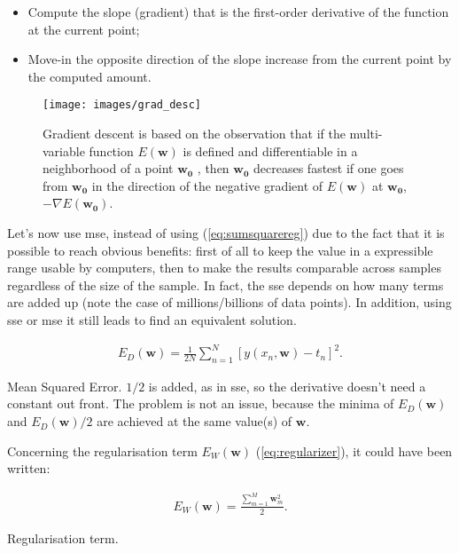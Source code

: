 \begin{itemize}
	\item Compute the slope (gradient) that is the first-order derivative of the function at the current point;
	\item Move-in the opposite direction of the slope increase from the current point by the computed amount.
\end{itemize}

\begin{figure}[H]
	\centering
	\texttt{[image: images/grad\_desc]}
	\caption[Gradient descent.]{Gradient descent is based on the observation that if the multi-variable function $E(\bm{w})$ is defined and differentiable in a neighborhood of a point $\bm{w_0}$ , then $\bm{w_0}$ decreases fastest if one goes from $\bm{w_0}$  in the direction of the negative gradient of $E(\bm{w})$ at $\bm{w_0}$, $-\nabla E(\bm{w_0})$.}
	\label{fig:grad_desc}
\end{figure}

\noindent Let's now use \gls{mse}, instead of using (\ref{eq:sumsquarereg}) due to the fact that it is possible to reach obvious benefits: first of all to keep the value in a expressible range usable by computers, then to make the results comparable across samples regardless of the size of the sample. In fact, the \gls{sse} depends on how many terms are added up (note the case of millions/billions of data points). In addition, using \gls{sse} or \gls{mse} it still leads to find an equivalent solution.

\begin{Equation}[H]
	\centering
	\begin{equation} \label{eq:mser}
		\begin{aligned}
			E_D(\bm{w}) = \frac{1}{2N} \sum_{n=1}^{N} [y(x_n,\bm{w})-t_n]^2 .
		\end{aligned}
	\end{equation}
	\caption[Mean Squared Error.]{Mean Squared Error. $1/2$ is added, as in \gls{sse}, so the derivative doesn't need a constant out front. The problem is not an issue, because the minima of $E_D(\bm{w})$ and $E_D(\bm{w}) / 2$ are achieved at the same value(s) of $\bm{w}$.}
\end{Equation}

\noindent Concerning the regularisation term $E_W(\bm{w})$ (\ref{eq:regularizer}), it could have been written:
\begin{Equation}[H]
	\centering
	\begin{equation} \label{eq:regnew}
		\begin{aligned}
			E_W(\bm{w}) = \frac{ \sum_{m=1}^{M} {\bm{w}^2_m}}{2} .
		\end{aligned}
	\end{equation}
	\caption[Regularisation term.]{Regularisation term.}
\end{Equation}

